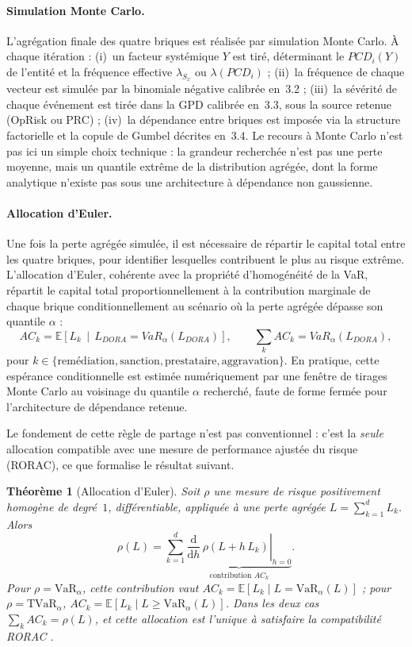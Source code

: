 \documentclass[11pt,a4paper]{article}
\theoremstyle{navystyle}
\newtheorem{theorem}{Théorème}[section]
\theoremstyle{navydef}
\newcommand{\E}{\mathbb{E}}
\newcommand{\VaR}{\mathrm{VaR}}
\newcommand{\TVaR}{\mathrm{TVaR}}
\newcommand{\dd}{\mathrm{d}}
\begin{document}
\paragraph{Simulation Monte Carlo.} L'agrégation finale des quatre briques
est réalisée par simulation Monte Carlo. À chaque itération : (i)~un facteur
systémique $Y$ est tiré, déterminant le $PCD_i(Y)$ de l'entité et
la fréquence effective $\lambda_{S_x}$ ou $\lambda(PCD_i)$ ; (ii)~la
fréquence de chaque vecteur est simulée par la binomiale négative calibrée
en~3.2 ; (iii)~la sévérité de chaque événement est tirée dans la GPD
calibrée en~3.3, sous la source retenue (OpRisk ou PRC) ; (iv)~la dépendance
entre briques est imposée via la structure factorielle et la copule de
Gumbel décrites en~3.4. Le recours à Monte Carlo n'est pas ici un simple
choix technique : la grandeur recherchée n'est pas une perte moyenne, mais
un quantile extrême de la distribution agrégée, dont la forme analytique
n'existe pas sous une architecture à dépendance non gaussienne.

\paragraph{Allocation d'Euler.} Une fois la perte agrégée simulée, il est
nécessaire de répartir le capital total entre les quatre briques, pour
identifier lesquelles contribuent le plus au risque extrême. L'allocation
d'Euler, cohérente avec la propriété d'homogénéité de la VaR, répartit le
capital total proportionnellement à la contribution marginale de chaque
brique conditionnellement au scénario où la perte agrégée dépasse son
quantile $\alpha$ :
\begin{equation}
AC_k = \mathbb{E}\!\left[L_k \,\middle|\, L_{DORA} = VaR_\alpha(L_{DORA})\right],
\qquad
\sum_{k} AC_k = VaR_\alpha(L_{DORA}),
\end{equation}
pour $k \in \{\text{remédiation}, \text{sanction}, \text{prestataire},
\text{aggravation}\}$. En pratique, cette espérance conditionnelle est
estimée numériquement par une fenêtre de tirages Monte Carlo au voisinage du
quantile $\alpha$ recherché, faute de forme fermée pour l'architecture de
dépendance retenue.

Le fondement de cette règle de partage n'est pas conventionnel : c'est la \emph{seule} allocation compatible avec une mesure de performance ajustée du risque (RORAC), ce que formalise le résultat suivant.

\begin{theorem}[Allocation d'Euler]\label{th:euler}
Soit $\rho$ une mesure de risque positivement homogène de degré~$1$, différentiable, appliquée à une perte agrégée $L=\sum_{k=1}^{d} L_k$. Alors
\begin{equation}
\rho(L)=\sum_{k=1}^{d}\underbrace{\left.\frac{\dd}{\dd h}\,\rho\!\left(L+h\,L_k\right)\right|_{h=0}}_{\text{contribution } AC_k}.
\end{equation}
Pour $\rho=\VaR_\alpha$, cette contribution vaut $AC_k=\E[L_k\mid L=\VaR_\alpha(L)]$ ; pour $\rho=\TVaR_\alpha$, $AC_k=\E[L_k\mid L\ge\VaR_\alpha(L)]$. Dans les deux cas $\sum_k AC_k=\rho(L)$, et cette allocation est l'unique à satisfaire la compatibilité RORAC \citep{tasche1999}.
\end{theorem}
\end{document}
